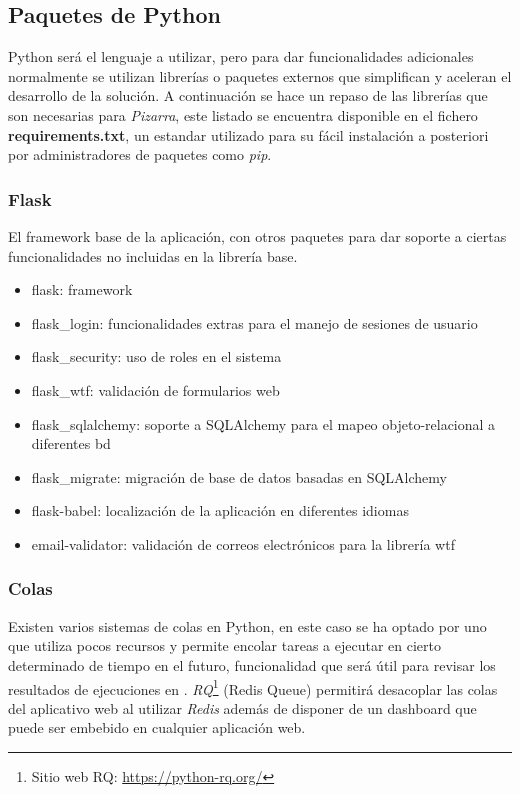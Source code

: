 \documentclass[11pt,spanish,listoffigures,listoftables]{tfgetsinf}
\begin{document}
\subsection{Paquetes de Python}

Python será el lenguaje a utilizar, pero para dar funcionalidades adicionales normalmente se utilizan librerías o \Gls{paquete}s externos que simplifican y aceleran el desarrollo de la solución. A continuación se hace un repaso de las librerías que son necesarias para \textit{Pizarra}, este listado se encuentra disponible en el fichero \textbf{requirements.txt}, un estandar utilizado para su fácil instalación a posteriori por administradores de paquetes como \textit{pip}.
	
\subsubsection{Flask}

El framework base de la aplicación, con otros \Gls{paquete}s para dar soporte a ciertas funcionalidades no incluidas en la librería base.

\begin{itemize}
	\item flask: framework
	\item flask\_login: funcionalidades extras para el manejo de sesiones de usuario
	\item flask\_security: uso de roles en el sistema  
	\item flask\_wtf: validación de formularios web
	\item flask\_sqlalchemy: soporte a SQLAlchemy para el mapeo objeto-relacional a diferentes \acrshort{bd}
	\item flask\_migrate: migración de base de datos basadas en SQLAlchemy
	\item flask-babel: localización de la aplicación en diferentes idiomas
	\item email-validator: validación de correos electrónicos para la librería wtf
\end{itemize}

\subsubsection{Colas}

Existen varios sistemas de \Gls{cola}s en Python, en este caso se ha optado por uno que utiliza pocos recursos y permite encolar tareas a ejecutar en cierto determinado de tiempo en el futuro, funcionalidad que será útil para revisar los resultados de ejecuciones en \kahan. \textit{RQ}\footnote{Sitio web RQ: \url{https://python-rq.org/}} (Redis Queue) permitirá desacoplar las colas del aplicativo web al utilizar \textit{Redis} además de disponer de un \foreignlanguage{english}{dashboard} que puede ser embebido en cualquier aplicación web.
\end{document}
